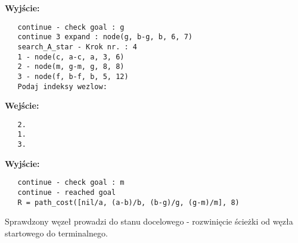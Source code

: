 \documentclass[11pt]{article} %
\begin{document}
\textbf{Wyjście:}
\begin{verbatim}
   continue - check goal : g
   continue 3 expand : node(g, b-g, b, 6, 7)
   search_A_star - Krok nr. : 4
   1 - node(c, a-c, a, 3, 6)
   2 - node(m, g-m, g, 8, 8)
   3 - node(f, b-f, b, 5, 12)
   Podaj indeksy wezlow:
\end{verbatim}
\textbf{Wejście:}
\begin{verbatim}
   2.
   1.
   3.
\end{verbatim}

\textbf{Wyjście:}
\begin{verbatim}
   continue - check goal : m
   continue - reached goal
   R = path_cost([nil/a, (a-b)/b, (b-g)/g, (g-m)/m], 8)
\end{verbatim}
Sprawdzony węzeł prowadzi do stanu docelowego - rozwinięcie ścieżki od węzła startowego do terminalnego.
\end{document}
